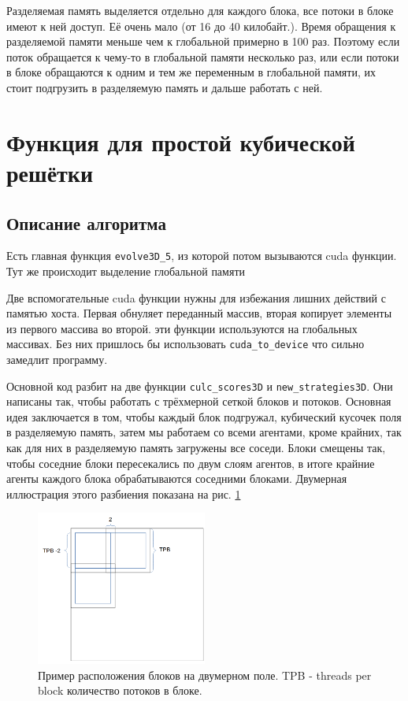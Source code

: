 \documentclass[a4paper,12pt]{article}
\begin{document}
Разделяемая память выделяется отдельно для каждого блока, все потоки в блоке имеют к ней доступ. Её очень мало (от 16 до 40 килобайт.). Время обращения к разделяемой памяти меньше чем к глобальной примерно в 100 раз. Поэтому если поток обращается к чему-то в глобальной памяти несколько раз, или если потоки в блоке обращаются к одним и тем же переменным в глобальной памяти, их стоит подгрузить в разделяемую память и дальше работать с ней.

\section{Функция для простой кубической решётки}

\subsection{Описание алгоритма}

Есть главная функция \verb|evolve3D_5|, из которой потом вызываются cuda функции. Тут же происходит выделение глобальной памяти

Две вспомогательные cuda функции нужны для избежания лишних действий с памятью хоста. Первая обнуляет переданный массив, вторая копирует элементы из первого массива во второй. эти функции используются на глобальных массивах. Без них пришлось бы использовать \verb|cuda_to_device| что сильно замедлит программу.

Основной код разбит на две функции \verb|culc_scores3D| и \verb|new_strategies3D|. Они написаны так, чтобы работать с трёхмерной сеткой блоков и потоков. Основная идея заключается в том, чтобы каждый блок подгружал, кубический кусочек поля в разделяемую память, затем мы работаем со всеми агентами, кроме крайних, так как для них в разделяемую память загружены все соседи. Блоки смещены так, чтобы соседние блоки пересекались по двум слоям агентов, в итоге крайние агенты каждого блока обрабатываются соседними блоками. Двумерная иллюстрация этого разбиения показана на рис. \ref{fig:blocks}

\begin{figure}[H]
	\centering
	\includegraphics[width = 0.5\textwidth]{Images/Block visualisation.png}
	\caption{Пример расположения блоков на двумерном поле. TPB - threads per block количество потоков в блоке.}
	\label{fig:blocks}
\end{figure}
\end{document}
